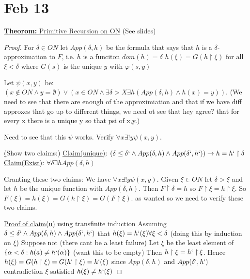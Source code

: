 \documentclass{article}
\newcommand{\set}[1]{\{#1\}}
\begin{document}
    \section{Feb 13}
    \underline{\textbf{Theorom:} Primitive Recursion on ON}
    (See slides)
    \begin{proof}
        For $\delta \in ON$ let $App(\delta,h)$ be the formula that says that $h$ is a $\delta$-approximation to $F$, i.e.
        $h$ is a funciton
        $dom(h)=\delta$
        $h(\xi)=G(h \upharpoonright \xi)$ for all $\xi < \delta$
        where $G(s)$ is the unique $y$ with $\varphi(s,y)$

        Let $\psi (x,y)$ be: $(x \notin ON \wedge y = \emptyset) \vee (x \in ON \wedge \exists \delta > X \exists h(App(\delta,h) \wedge h(x) = y))$.
        (We need to see that there are enough of the approximiation and that if we have diff approxes that go up to different things, we need ot see that hey agree?
        that for every x there is a unique y so that psi of x,y.)

        Need to see that this $\psi$ works.
        Verify $\forall x \exists! y \psi(x,y)$.

        \underline(Show two claims:)
        \underline{Claim(unique)}: $(\delta \leq \delta` \wedge App(\delta,h) \wedge App(\delta`,h`)) \rightarrow h=h` \upharpoonright \delta$
        \underline{Claim(Exist)}: $\forall \delta \exists h App(\delta,h)$

        Granting these two claims:
        We have $\forall x \exists! y \psi(x,y)$.
        Given $\xi \in ON$ let $\delta > \xi$ and let $h$ be the unique function with $App(\delta,h)$.
        Then $F \upharpoonright \delta = h$ so $F \upharpoonright \xi = h \upharpoonright \xi$.
        So $F(\xi) = h(\xi) = G(h \upharpoonright \xi) = G(F \upharpoonright \xi)$.
        as wanted so we need to verify these two claims.

        \underline{Proof of claim(u)} using transfinite induction
        Assuming $\delta \leq \delta` \wedge App(\delta,h) \wedge App(\delta`,h`)$ that $h(\xi)=h`(\xi) \forall \xi < \delta$
        (doing this by induction on $\xi$)
        Suppose not (there cant be a least failure)
        Let $\xi$ be the least element of $\set{\alpha < \delta : h(a) \neq h`(\alpha)}$ (want this to be empty)
        Then $h \upharpoonright \xi = h` \upharpoonright \xi$.
        Hence $h(\xi) = G(h \upharpoonright \xi) = G(h` \upharpoonright \xi) = h`(\xi)$
        since $App(\delta,h)$ and $App(\delta`,h`)$
        contradiction $\xi$ satisfied $h(\xi) \neq h`(\xi)$


\end{proof}
\end{document}
